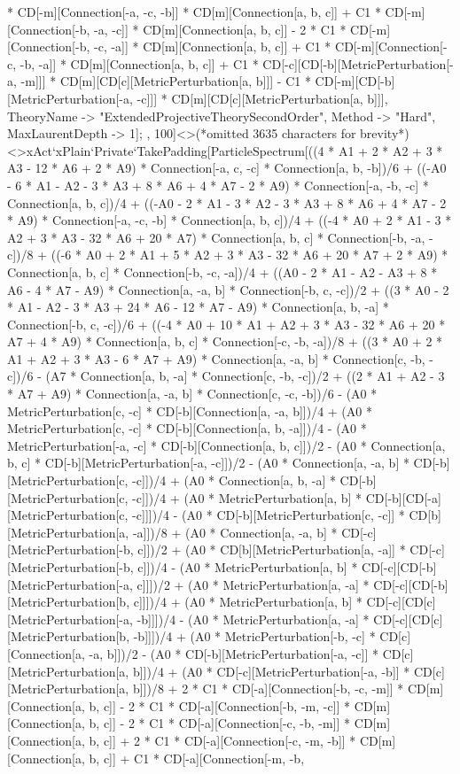 * CD[-m][Connection[-a, -c, -b]] * CD[m][Connection[a, b, c]] + C1 * CD[-m][Connection[-b, -a, -c]] * CD[m][Connection[a, b, c]] - 2 * C1 * CD[-m][Connection[-b, -c, -a]] * CD[m][Connection[a, b, c]] + C1 * CD[-m][Connection[-c, -b, -a]] * CD[m][Connection[a, b, c]] + C1 * CD[-c][CD[-b][MetricPerturbation[-a, -m]]] * CD[m][CD[c][MetricPerturbation[a, b]]] - C1 * CD[-m][CD[-b][MetricPerturbation[-a, -c]]] * CD[m][CD[c][MetricPerturbation[a, b]]], TheoryName -> "ExtendedProjectiveTheorySecondOrder", Method -> "Hard", MaxLaurentDepth -> 1]; , 100]<>(*omitted 3635 characters for brevity*)<>xAct`xPlain`Private`TakePadding[ParticleSpectrum[((4 * A1 + 2 * A2 + 3 * A3 - 12 * A6 + 2 * A9) * Connection[-a, c, -c] * Connection[a, b, -b])/6 + ((-A0 - 6 * A1 - A2 - 3 * A3 + 8 * A6 + 4 * A7 - 2 * A9) * Connection[-a, -b, -c] * Connection[a, b, c])/4 + ((-A0 - 2 * A1 - 3 * A2 - 3 * A3 + 8 * A6 + 4 * A7 - 2 * A9) * Connection[-a, -c, -b] * Connection[a, b, c])/4 + ((-4 * A0 + 2 * A1 - 3 * A2 + 3 * A3 - 32 * A6 + 20 * A7) * Connection[a, b, c] * Connection[-b, -a, -c])/8 + ((-6 * A0 + 2 * A1 + 5 * A2 + 3 * A3 - 32 * A6 + 20 * A7 + 2 * A9) * Connection[a, b, c] * Connection[-b, -c, -a])/4 + ((A0 - 2 * A1 - A2 - A3 + 8 * A6 - 4 * A7 - A9) * Connection[a, -a, b] * Connection[-b, c, -c])/2 + ((3 * A0 - 2 * A1 - A2 - 3 * A3 + 24 * A6 - 12 * A7 - A9) * Connection[a, b, -a] * Connection[-b, c, -c])/6 + ((-4 * A0 + 10 * A1 + A2 + 3 * A3 - 32 * A6 + 20 * A7 + 4 * A9) * Connection[a, b, c] * Connection[-c, -b, -a])/8 + ((3 * A0 + 2 * A1 + A2 + 3 * A3 - 6 * A7 + A9) * Connection[a, -a, b] * Connection[c, -b, -c])/6 - (A7 * Connection[a, b, -a] * Connection[c, -b, -c])/2 + ((2 * A1 + A2 - 3 * A7 + A9) * Connection[a, -a, b] * Connection[c, -c, -b])/6 - (A0 * MetricPerturbation[c, -c] * CD[-b][Connection[a, -a, b]])/4 + (A0 * MetricPerturbation[c, -c] * CD[-b][Connection[a, b, -a]])/4 - (A0 * MetricPerturbation[-a, -c] * CD[-b][Connection[a, b, c]])/2 - (A0 * Connection[a, b, c] * CD[-b][MetricPerturbation[-a, -c]])/2 - (A0 * Connection[a, -a, b] * CD[-b][MetricPerturbation[c, -c]])/4 + (A0 * Connection[a, b, -a] * CD[-b][MetricPerturbation[c, -c]])/4 + (A0 * MetricPerturbation[a, b] * CD[-b][CD[-a][MetricPerturbation[c, -c]]])/4 - (A0 * CD[-b][MetricPerturbation[c, -c]] * CD[b][MetricPerturbation[a, -a]])/8 + (A0 * Connection[a, -a, b] * CD[-c][MetricPerturbation[-b, c]])/2 + (A0 * CD[b][MetricPerturbation[a, -a]] * CD[-c][MetricPerturbation[-b, c]])/4 - (A0 * MetricPerturbation[a, b] * CD[-c][CD[-b][MetricPerturbation[-a, c]]])/2 + (A0 * MetricPerturbation[a, -a] * CD[-c][CD[-b][MetricPerturbation[b, c]]])/4 + (A0 * MetricPerturbation[a, b] * CD[-c][CD[c][MetricPerturbation[-a, -b]]])/4 - (A0 * MetricPerturbation[a, -a] * CD[-c][CD[c][MetricPerturbation[b, -b]]])/4 + (A0 * MetricPerturbation[-b, -c] * CD[c][Connection[a, -a, b]])/2 - (A0 * CD[-b][MetricPerturbation[-a, -c]] * CD[c][MetricPerturbation[a, b]])/4 + (A0 * CD[-c][MetricPerturbation[-a, -b]] * CD[c][MetricPerturbation[a, b]])/8 + 2 * C1 * CD[-a][Connection[-b, -c, -m]] * CD[m][Connection[a, b, c]] - 2 * C1 * CD[-a][Connection[-b, -m, -c]] * CD[m][Connection[a, b, c]] - 2 * C1 * CD[-a][Connection[-c, -b, -m]] * CD[m][Connection[a, b, c]] + 2 * C1 * CD[-a][Connection[-c, -m, -b]] * CD[m][Connection[a, b, c]] + C1 * CD[-a][Connection[-m, -b, 